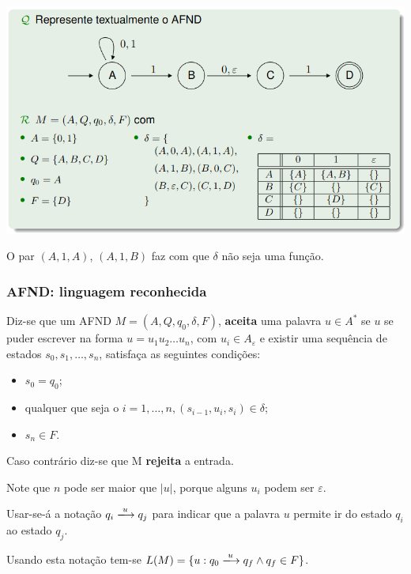 \documentclass{article}
\begin{document}
\begin{center}
  \includegraphics[scale=0.4]{51}
\end{center}

\begin{flushleft}
  O par $(A, 1, A)$, $(A, 1, B)$ faz com que $\delta$ não seja uma função.
\end{flushleft}

\subsubsection{AFND: linguagem reconhecida}

\begin{flushleft}
  Diz-se que um AFND $M = (A,Q, q_0, \delta, F)$, \textbf{aceita} uma palavra $u \in A^*$
  se $u$ se puder escrever na forma $u = u_1u_2 \dots u_n$, com $u_i \in A_\varepsilon$ e existir uma sequência de estados
  $s_0,s_1, \dots, s_n$, satisfaça as seguintes condições:
  \begin{itemize}
    \item $s_0 = q_0$;
    \item qualquer que seja o $i = 1, \dots, n, (s_{i-1}, u_i, s_i) \in \delta$;
    \item $s_n \in F$.
  \end{itemize}
  \item Caso contrário diz-se que M \textbf{rejeita} a entrada.
  \item Note que $n$ pode ser maior que $|u|$, porque alguns $u_i$ podem ser $\varepsilon$.
  \item Usar-se-á a notação $q_i \xlongrightarrow{u} q_j$ para indicar que a palavra $u$ permite ir do estado $q_i$ ao estado $q_j$.
  \item Usando esta notação tem-se $L(M) = \{u : q_0 \xlongrightarrow{u} q_f \wedge q_f \in F\}$.
\end{flushleft}
\end{document}

